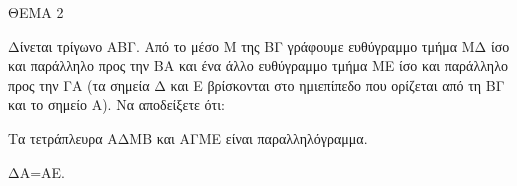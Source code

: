 
ΘΕΜΑ 2

Δίνεται τρίγωνο ΑΒΓ. Από το μέσο Μ της ΒΓ γράφουμε ευθύγραμμο τμήμα ΜΔ ίσο και παράλληλο προς την ΒΑ και ένα άλλο ευθύγραμμο τμήμα ΜΕ ίσο και παράλληλο προς την ΓΑ (τα σημεία Δ και Ε βρίσκονται στο ημιεπίπεδο που ορίζεται από τη ΒΓ και το σημείο Α). Να αποδείξετε ότι:

\begin{alist}
\item Τα τετράπλευρα ΑΔΜΒ και ΑΓΜΕ είναι παραλληλόγραμμα. 

\item ΔΑ=ΑΕ. 
\end{alist}
